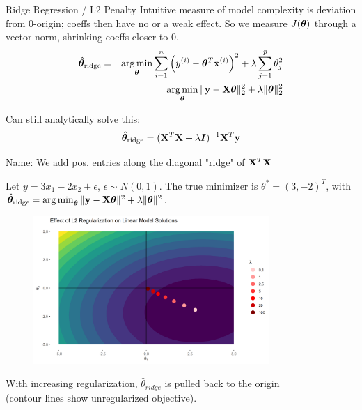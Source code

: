 \documentclass[11pt,compress,t,notes=noshow, xcolor=table]{beamer}
\begin{document}
\begin{vbframe}{Ridge Regression / L2 Penalty}
Intuitive measure of model complexity is deviation from 0-origin; coeffs then have no or a weak effect. 
So we measure $J(\bm{\theta})$ through a vector norm, shrinking coeffs closer to 0.\\
\vspace{0.2cm}
\begin{eqnarray*}  
\hat{\bm{\theta}}_{\text{ridge}} &=& \operatorname*{arg\,min}_{\bm{\theta}} \sum\limits_{i=1}^n \left(y^{(i)} - \bm{\theta}^T \mathbf{x}^{(i)} \right)^2 + \lambda \sum_{j=1}^{p} \theta_j^2 \\
&=& \operatorname*{arg\,min}_{\bm{\theta}} \| \mathbf{y} - \mathbf{X} \bm{\theta} \|_2^2  + \lambda \|\bm{\theta}\|_2^2
\end{eqnarray*}

Can still analytically solve this:
$$\hat{\bm{\theta}}_{\text{ridge}} = ({\mathbf{X}}^T \mathbf{X}  + \lambda \boldsymbol{I})^{-1} \mathbf{X}^T\mathbf{y}$$

Name: We add pos. entries along the diagonal "ridge" of $\mathbf{X}^T \mathbf{X}$

\framebreak 

Let $y=3x_{1} -2x_{2} +\epsilon $, $ \epsilon \sim N( 0,1)$. The true minimizer is $\theta ^{*} =( 3,-2)^{T}$, with $ \hat{\bm{\theta}}_{\text{ridge}} = \operatorname*{arg\,min}_{\bm{\theta}} \|\mathbf{y} - \mathbf{X} \bm{\theta}\|^2 + \lambda \|\bm{\theta}\|^2 $.

\begin{figure}
\includegraphics[width=0.8\textwidth]{figure/lin_model_regu_02.png}
\end{figure}
\vspace{-0.2cm}
{\small With increasing regularization, $\hat{\theta}_{\textit{ridge}}$ is pulled back to the origin\\ (contour lines show unregularized objective).}


\end{vbframe}
\end{document}
